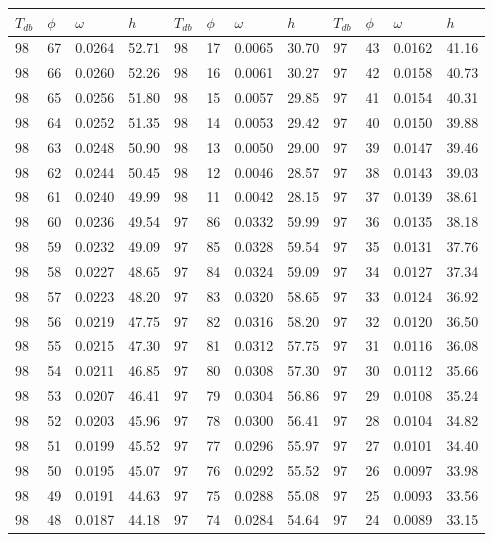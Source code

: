 \begin{tabular}{llll|llll|llll}
 \toprule 
\(T_{db}\) & \(\phi\) & \(\omega\) & \(h\) & \(T_{db}\) & \(\phi\) & \(\omega\) & \(h\) & \(T_{db}\) & \(\phi\) & \(\omega\) & \(h\)  \\ \midrule 
98 & 67 & 0.0264 & 52.71 & 98 & 17 & 0.0065 & 30.70 & 97 & 43 & 0.0162 & 41.16\\
98 & 66 & 0.0260 & 52.26 & 98 & 16 & 0.0061 & 30.27 & 97 & 42 & 0.0158 & 40.73\\
98 & 65 & 0.0256 & 51.80 & 98 & 15 & 0.0057 & 29.85 & 97 & 41 & 0.0154 & 40.31\\
98 & 64 & 0.0252 & 51.35 & 98 & 14 & 0.0053 & 29.42 & 97 & 40 & 0.0150 & 39.88\\
98 & 63 & 0.0248 & 50.90 & 98 & 13 & 0.0050 & 29.00 & 97 & 39 & 0.0147 & 39.46\\
98 & 62 & 0.0244 & 50.45 & 98 & 12 & 0.0046 & 28.57 & 97 & 38 & 0.0143 & 39.03\\
98 & 61 & 0.0240 & 49.99 & 98 & 11 & 0.0042 & 28.15 & 97 & 37 & 0.0139 & 38.61\\
98 & 60 & 0.0236 & 49.54 & 97 & 86 & 0.0332 & 59.99 & 97 & 36 & 0.0135 & 38.18\\
98 & 59 & 0.0232 & 49.09 & 97 & 85 & 0.0328 & 59.54 & 97 & 35 & 0.0131 & 37.76\\
98 & 58 & 0.0227 & 48.65 & 97 & 84 & 0.0324 & 59.09 & 97 & 34 & 0.0127 & 37.34\\
98 & 57 & 0.0223 & 48.20 & 97 & 83 & 0.0320 & 58.65 & 97 & 33 & 0.0124 & 36.92\\
98 & 56 & 0.0219 & 47.75 & 97 & 82 & 0.0316 & 58.20 & 97 & 32 & 0.0120 & 36.50\\
98 & 55 & 0.0215 & 47.30 & 97 & 81 & 0.0312 & 57.75 & 97 & 31 & 0.0116 & 36.08\\
98 & 54 & 0.0211 & 46.85 & 97 & 80 & 0.0308 & 57.30 & 97 & 30 & 0.0112 & 35.66\\
98 & 53 & 0.0207 & 46.41 & 97 & 79 & 0.0304 & 56.86 & 97 & 29 & 0.0108 & 35.24\\
98 & 52 & 0.0203 & 45.96 & 97 & 78 & 0.0300 & 56.41 & 97 & 28 & 0.0104 & 34.82\\
98 & 51 & 0.0199 & 45.52 & 97 & 77 & 0.0296 & 55.97 & 97 & 27 & 0.0101 & 34.40\\
98 & 50 & 0.0195 & 45.07 & 97 & 76 & 0.0292 & 55.52 & 97 & 26 & 0.0097 & 33.98\\
98 & 49 & 0.0191 & 44.63 & 97 & 75 & 0.0288 & 55.08 & 97 & 25 & 0.0093 & 33.56\\
98 & 48 & 0.0187 & 44.18 & 97 & 74 & 0.0284 & 54.64 & 97 & 24 & 0.0089 & 33.15\\

\end{tabular}
